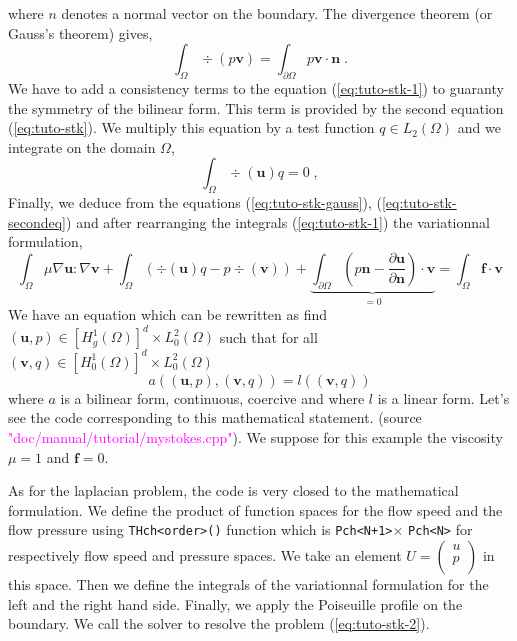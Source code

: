 %
where $n$ denotes a normal vector on the boundary.
The divergence theorem (or Gauss's theorem) gives,
%
\begin{equation}
\int_\Omega \div(p \mathbf v) = \int_{\partial\Omega} p \mathbf v\cdot \mathbf n \;.
\label{eq:tuto-stk-gauss}
\end{equation}
%
We have to add a consistency terms to the equation (\ref{eq:tuto-stk-1}) to
guaranty the symmetry of the bilinear form.
This term is provided by the second equation (\ref{eq:tuto-stk}). We multiply this equation
by a test function $q\in L_2(\Omega)$ and we integrate on the domain $\Omega$,
%
\begin{equation}
\int_{\Omega} \div(\mathbf u) q = 0 \;,
\label{eq:tuto-stk-secondeq}
\end{equation}
%
Finally, we deduce from the equations (\ref{eq:tuto-stk-gauss}), (\ref{eq:tuto-stk-secondeq})
and after rearranging the integrals (\ref{eq:tuto-stk-1}) the variationnal formulation,
%
\begin{equation}
\int_\Omega \mu \nabla \mathbf u :\nabla \mathbf v
+\int_\Omega \left( \div(\mathbf u) q - p \div(\mathbf v) \right)
+\underbrace{
    \int_{\partial\Omega} \left( p \mathbf n - \frac{\partial \mathbf u}{\partial \mathbf n} \right)
     \cdot \mathbf v
  }_{=0}
=\int_\Omega \mathbf f \cdot \mathbf v 
\label{eq:tuto-stk-varform}
\end{equation}
%
We have an equation which can be rewritten as find $(\mathbf u,p)\in [H_g^1(\Omega)]^d\times L_0^2(\Omega)$
such that for all $(\mathbf v,q) \in [H_0^1(\Omega)]^d \times L_0^2(\Omega)$
\begin{equation}
    a((\mathbf u,p),(\mathbf v,q)) = l((\mathbf v,q))
\label{eq:tuto-stk-2}
\end{equation}
%
where $a$ is a bilinear form, continuous, coercive and where $l$ is a linear form.
Let's see the \feel code corresponding to this mathematical statement.
(source \textcolor{magenta}{"doc/manual/tutorial/mystokes.cpp"}).
We suppose for this example the viscosity $\mu=1$ and $\mathbf f = 0$.
%
\vspace{2mm}

\vspace{2mm}
%
As for the laplacian problem, the code is very closed to the mathematical formulation.
We define the product of function spaces for the flow speed and the flow pressure
using \lstinline!THch<order>()! function which is \lstinline!Pch<N+1>!$\times$ \lstinline!Pch<N>!
for respectively flow speed and pressure spaces.
We take an element 
$U=\left(
    \begin{array}{c}
        u \\
        p \\
    \end{array}
\right)
$
in this space. Then we define the integrals of the variationnal formulation
for the left and the right hand side. Finally, we apply the Poiseuille profile on the boundary.
We call the solver to resolve the problem (\ref{eq:tuto-stk-2}).



